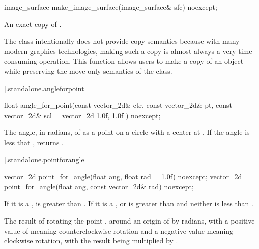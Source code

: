 %
\begin{itemdecl}
image_surface make_image_surface(image_surface& sfc) noexcept;
\end{itemdecl}
\begin{itemdescr}
\pnum
\returns
An exact copy of .

\pnum
\begin{note}
The  class intentionally does not provide copy semantics because with many modern graphics technologies, making such a copy is almost always a very time consuming operation. This function allows users to make a copy of an  object while preserving the move-only semantics of the  class.
\end{note}
\end{itemdescr}
 [\iotwod.standalone.angleforpoint] {}

%
\begin{itemdecl}
float angle_for_point(const vector_2d& ctr, const vector_2d& pt,
  const vector_2d& scl = vector_2d{ 1.0f, 1.0f }) noexcept;
\end{itemdecl}
\begin{itemdescr}
\pnum
\returns
The angle, in radians, of  as a point on a circle with a center at . If the angle is less that , returns .
\end{itemdescr}

 [\iotwod.standalone.pointforangle] {}

%
\begin{itemdecl}
vector_2d point_for_angle(float ang, float rad = 1.0f) noexcept;
vector_2d point_for_angle(float ang, const vector_2d& rad) noexcept;
\end{itemdecl}
\begin{itemdescr}
\pnum
\requires
If it is a ,  is greater than . If it is a ,  or  is greater than  and neither is less than .

\pnum
\returns
The result of rotating the point , around an origin of  by  radians, with a positive value of  meaning counterclockwise rotation and a negative value meaning clockwise rotation, with the result being multiplied by .
\end{itemdescr}

